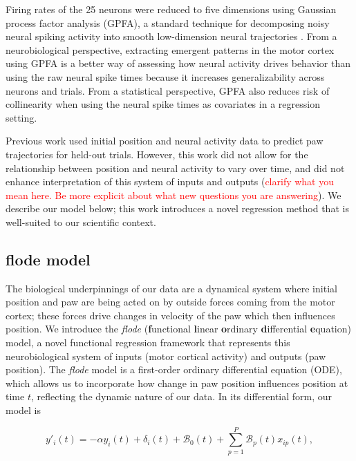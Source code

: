 \documentclass[preprint]{JASA}
\begin{document}
Firing rates of the 25 neurons were reduced to five dimensions using
Gaussian process factor analysis (GPFA), a standard technique for
decomposing noisy neural spiking activity into smooth low-dimension
neural trajectories \citep{yu2009}. From a neurobiological perspective,
extracting emergent patterns in the motor cortex using GPFA is a better
way of assessing how neural activity drives behavior than using the raw
neural spike times because it increases generalizability across neurons
and trials. From a statistical perspective, GPFA also reduces risk of
collinearity when using the neural spike times as covariates in a
regression setting.

Previous work used initial position and neural activity data to predict
paw trajectories for held-out trials. However, this work did not allow
for the relationship between position and neural activity to vary over
time, and did not enhance interpretation of this system of inputs and
outputs
(\textcolor{red}{clarify what you mean here. Be more explicit about what new questions you are answering}).
We describe our model below; this work introduces a novel regression
method that is well-suited to our scientific context.

\hypertarget{flode-model}{%
\subsection{flode model}\label{flode-model}}

\label{sec:flode}

The biological underpinnings of our data are a dynamical system where
initial position and paw are being acted on by outside forces coming
from the motor cortex; these forces drive changes in velocity of the paw
which then influences position. We introduce the \emph{flode}
(\textbf{f}unctional \textbf{l}inear \textbf{o}rdinary
\textbf{d}ifferential \textbf{e}quation) model, a novel functional
regression framework that represents this neurobiological system of
inputs (motor cortical activity) and outputs (paw position). The
\emph{flode} model is a first-order ordinary differential equation
(ODE), which allows us to incorporate how change in paw position
influences position at time \(t\), reflecting the dynamic nature of our
data. In its differential form, our model is

\begin{equation}
\label{eq:flode_deriv}
y'_i(t) = -\alpha y_i(t) + \delta_i(t) + \mathcal{B}_0(t) + \sum_{p = 1}^P \mathcal{B}_p(t) x_{ip}(t),
\end{equation}
\end{document}
